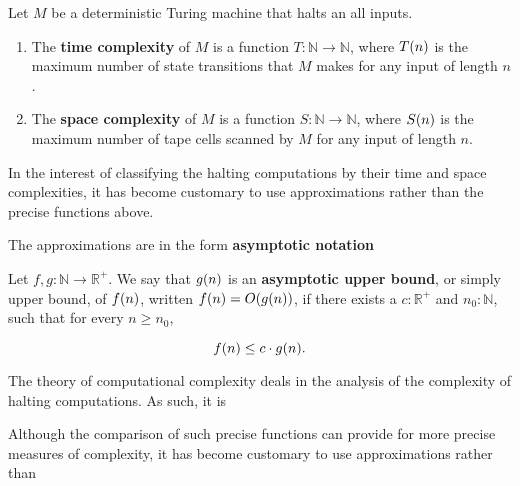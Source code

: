\begin{definition} Let $M$ be a deterministic Turing machine that halts an all inputs.

\begin{enumerate}

\item The \textbf{time complexity} of $M$ is a function
$T:\mathbb{N}\rightarrow \mathbb{N}$, where $T\mathopen{}\left({n}\right)\mathclose{}$ is the maximum number of
state transitions that $M$ makes for any input of length $n$.

\item The \textbf{space complexity} of $M$ is a function
$S:\mathbb{N}\rightarrow \mathbb{N}$, where $S\mathopen{}\left({n}\right)\mathclose{}$ is the maximum number of
tape cells scanned by $M$ for any input of length $n$.

\end{enumerate}

\end{definition}

In the interest of classifying the halting computations by their time and space
complexities, it has become customary to use approximations rather than the
precise functions above.

The approximations are in the form \textbf{asymptotic notation}

\begin{definition} Let $f,g:\mathbb{N}\rightarrow \mathbb{R}^+$. We say that
$g\mathopen{}\left({n}\right)\mathclose{}$ is an \textbf{asymptotic upper bound}, or simply upper bound, of
$f\mathopen{}\left({n}\right)\mathclose{}$, written $f\mathopen{}\left({n}\right)\mathclose{}=O\mathopen{}\left({g\mathopen{}\left({n}\right)\mathclose{}}\right)\mathclose{}$, if there exists a $c:\mathbb{R}^+$ and
$n_0:\mathbb{N}$, such that for every $n\geq n_0$,

$$f\mathopen{}\left({n}\right)\mathclose{}\leq c\cdot g\mathopen{}\left({n}\right)\mathclose{}.$$

\end{definition}


The theory of computational complexity deals in the analysis of the complexity
of halting computations. As such, it is 

Although the comparison of such precise functions can provide for more precise measures of complexity, it has become customary to use approximations rather than 




